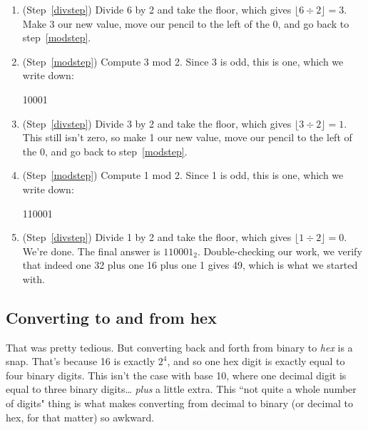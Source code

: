 \begin{enumerate}
\item (Step~\ref{divstep}) Divide 6 by 2 and take the floor, which gives
$\lfloor \text{6} \div 2 \rfloor = 3$.  Make 3 our new value, move our
pencil to the left of the 0, and go back to step~\ref{modstep}.

\item (Step~\ref{modstep}) Compute 3 mod 2. Since 3 is odd, this is
one, which we write down:

{\Large
\begin{center}
10001
\end{center}
}

\item (Step~\ref{divstep}) Divide 3 by 2 and take the floor, which gives
$\lfloor \text{3} \div 2 \rfloor = 1$.  This still isn't zero, so make 1
our new value, move our pencil to the left of the 0, and go back to
step~\ref{modstep}.

\item (Step~\ref{modstep}) Compute 1 mod 2. Since 1 is odd, this is
one, which we write down:

{\Large
\begin{center}
110001
\end{center}
}

\item (Step~\ref{divstep}) Divide 1 by 2 and take the floor, which gives
$\lfloor \text{1} \div 2 \rfloor = 0$.  We're done. The final answer is
$110001_2$. Double-checking our work, we verify that indeed one 32 plus one
16 plus one 1 gives 49, which is what we started with.
\end{enumerate}


\subsection{Converting to and from hex}

That was pretty tedious. But converting back and forth from binary to
\textit{hex} is a snap. That's because 16 is exactly $2^4$, and so one hex
digit is exactly equal to four binary digits. This isn't the case with base
10, where one decimal digit is equal to three binary digits\dots
\textit{plus} a little extra. This ``not quite a whole number of digits"
thing is what makes converting from decimal to binary (or decimal to hex,
for that matter) so awkward.

